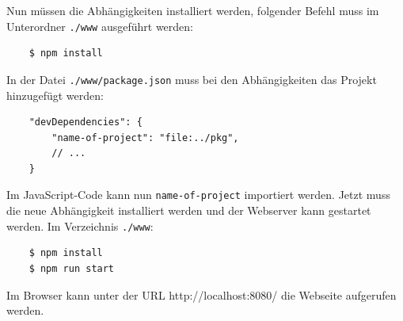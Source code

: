 Nun müssen die Abhängigkeiten installiert werden, folgender Befehl muss im Unterordner \verb"./www" ausgeführt werden:

\begin{lstlisting}
    $ npm install
\end{lstlisting}

In der Datei \verb"./www/package.json" muss bei den Abhängigkeiten das Projekt hinzugefügt werden:

\begin{lstlisting}
    "devDependencies": {
        "name-of-project": "file:../pkg",
        // ...
    }
\end{lstlisting}

Im JavaScript-Code kann nun \verb"name-of-project" importiert werden. Jetzt muss die neue Abhängigkeit installiert werden und der Webserver kann gestartet werden. Im Verzeichnis \verb"./www":

\begin{lstlisting}
    $ npm install
    $ npm run start
\end{lstlisting}

Im Browser kann unter der URL http://localhost:8080/ die Webseite aufgerufen werden.
